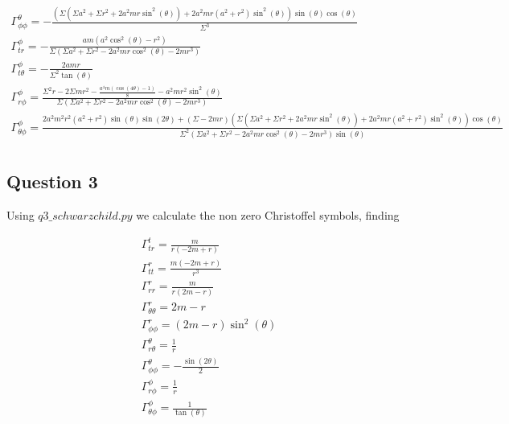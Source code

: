\documentclass[10pt,a4paper]{report}
\begin{document}
\begin{align*}
\Gamma^\theta_{\phi\phi} = - \frac{\left(\Sigma \left(\Sigma a^{2} + \Sigma r^{2} + 2 a^{2} m r \sin^{2}{\left(\theta \right)}\right) + 2 a^{2} m r \left(a^{2} + r^{2}\right) \sin^{2}{\left(\theta \right)}\right) \sin{\left(\theta \right)} \cos{\left(\theta \right)}}{\Sigma^{3}}\\
\Gamma^\phi_{tr} = - \frac{a m \left(a^{2} \cos^{2}{\left(\theta \right)} - r^{2}\right)}{\Sigma \left(\Sigma a^{2} + \Sigma r^{2} - 2 a^{2} m r \cos^{2}{\left(\theta \right)} - 2 m r^{3}\right)}\\
\Gamma^\phi_{t\theta} = - \frac{2 a m r}{\Sigma^{2} \tan{\left(\theta \right)}}\\
\Gamma^\phi_{r\phi} = \frac{\Sigma^{2} r - 2 \Sigma m r^{2} - \frac{a^{4} m \left(\cos{\left(4 \theta \right)} - 1\right)}{8} - a^{2} m r^{2} \sin^{2}{\left(\theta \right)}}{\Sigma \left(\Sigma a^{2} + \Sigma r^{2} - 2 a^{2} m r \cos^{2}{\left(\theta \right)} - 2 m r^{3}\right)}\\
\Gamma^\phi_{\theta\phi} = \frac{2 a^{2} m^{2} r^{2} \left(a^{2} + r^{2}\right) \sin{\left(\theta \right)} \sin{\left(2 \theta \right)} + \left(\Sigma - 2 m r\right) \left(\Sigma \left(\Sigma a^{2} + \Sigma r^{2} + 2 a^{2} m r \sin^{2}{\left(\theta \right)}\right) + 2 a^{2} m r \left(a^{2} + r^{2}\right) \sin^{2}{\left(\theta \right)}\right) \cos{\left(\theta \right)}}{\Sigma^{2} \left(\Sigma a^{2} + \Sigma r^{2} - 2 a^{2} m r \cos^{2}{\left(\theta \right)} - 2 m r^{3}\right) \sin{\left(\theta \right)}}\\
\end{align*}
\normalsize

\subsection*{Question 3}

Using $q3\_schwarzchild.py$ we calculate the non zero Christoffel symbols, finding

\small\begin{align*}
\Gamma^t_{tr} = \frac{m}{r \left(- 2 m + r\right)}\\
\Gamma^r_{tt} = \frac{m \left(- 2 m + r\right)}{r^{3}}\\
\Gamma^r_{rr} = \frac{m}{r \left(2 m - r\right)}\\
\Gamma^r_{\theta\theta} = 2 m - r\\
\Gamma^r_{\phi\phi} = \left(2 m - r\right) \sin^{2}{\left(\theta \right)}\\
\Gamma^\theta_{r\theta} = \frac{1}{r}\\
\Gamma^\theta_{\phi\phi} = - \frac{\sin{\left(2 \theta \right)}}{2}\\
\Gamma^\phi_{r\phi} = \frac{1}{r}\\
\Gamma^\phi_{\theta\phi} = \frac{1}{\tan{\left(\theta \right)}}\\
\end{align*}
\normalsize
\end{document}
